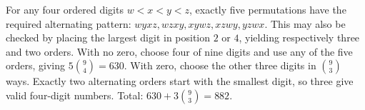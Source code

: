 For any four ordered digits $w<x<y<z$, exactly five permutations have the required alternating pattern: $wyxz,wzxy,xywz,xzwy,yzwx$. This may also be checked by placing the largest digit in position $2$ or $4$, yielding respectively three and two orders. With no zero, choose four of nine digits and use any of the five orders, giving $5\binom94=630$. With zero, choose the other three digits in $\binom93$ ways. Exactly two alternating orders start with the smallest digit, so three give valid four-digit numbers. Total: $630+3\binom93=\boxed{882}$.
